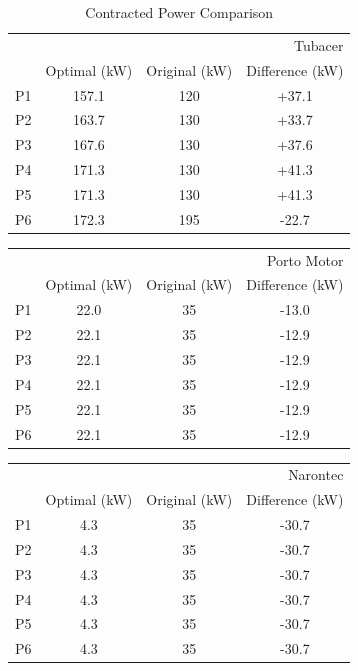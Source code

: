 \begin{table}[center]
\caption{Contracted Power Comparison}
\begin{tabular}{|c|c|c|c|}
 & \multicolumn{3}{r}{Tubacer} \\
 & Optimal (kW) & Original (kW) & Difference (kW) \\
P1 & 157.1 & 120 & +37.1 \\
P2 & 163.7 & 130 & +33.7 \\
P3 & 167.6 & 130 & +37.6 \\
P4 & 171.3 & 130 & +41.3 \\
P5 & 171.3 & 130 & +41.3 \\
P6 & 172.3 & 195 & -22.7 \\
\end{tabular}
\end{table}

\begin{table}[center]
\begin{tabular}{|c|c|c|c|}
 & \multicolumn{3}{r}{Porto Motor} \\
 & Optimal (kW) & Original (kW) & Difference (kW) \\
P1 & 22.0 & 35 & -13.0 \\
P2 & 22.1 & 35 & -12.9 \\
P3 & 22.1 & 35 & -12.9 \\
P4 & 22.1 & 35 & -12.9 \\
P5 & 22.1 & 35 & -12.9 \\
P6 & 22.1 & 35 & -12.9 \\
\end{tabular}
\end{table}

\begin{table}[center]
\begin{tabular}{|c|c|c|c|}
 & \multicolumn{3}{r}{Narontec} \\
 & Optimal (kW) & Original (kW) & Difference (kW) \\
P1 & 4.3 & 35 & -30.7 \\
P2 & 4.3 & 35 & -30.7 \\
P3 & 4.3 & 35 & -30.7 \\
P4 & 4.3 & 35 & -30.7 \\
P5 & 4.3 & 35 & -30.7 \\
P6 & 4.3 & 35 & -30.7 \\
\end{tabular}
\end{table}


